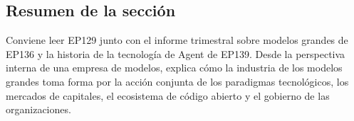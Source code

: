 \subsection{Resumen de la sección}

Conviene leer EP129 junto con el informe trimestral sobre modelos grandes de EP136 y la historia de la tecnología de Agent de EP139. Desde la perspectiva interna de una empresa de modelos, explica cómo la industria de los modelos grandes toma forma por la acción conjunta de los paradigmas tecnológicos, los mercados de capitales, el ecosistema de código abierto y el gobierno de las organizaciones.
